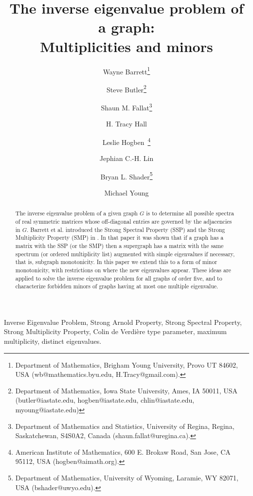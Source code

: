 \documentclass[11pt]{article}
\theoremstyle{definition}
\theoremstyle{definition}
\theoremstyle{definition}
\begin{document}
\title{The inverse eigenvalue problem of a graph: \\
Multiplicities and minors}
\author{Wayne Barrett\thanks{Department of Mathematics, Brigham Young University, Provo UT 84602, USA (wb@mathematics.byu.edu, H.Tracy@gmail.com).}
\and Steve Butler\thanks{Department of Mathematics, Iowa State University, Ames, IA 50011, USA (butler@iastate.edu, hogben@iastate.edu, chlin@iastate.edu, myoung@iastate.edu)}
\and Shaun M. Fallat\thanks{Department of Mathematics and Statistics, University of Regina, Regina, Saskatchewan, S4S0A2, Canada (shaun.fallat@uregina.ca).}
 \and H. Tracy Hall\footnotemark[1]
\and  Leslie Hogben\footnotemark[2]\, \thanks{American Institute of Mathematics, 600 E. Brokaw Road, San Jose, CA 95112, USA (hogben@aimath.org).}
\and Jephian C.-H. Lin\footnotemark[2]
\and Bryan L.  Shader\thanks{Department of Mathematics, University of Wyoming,  Laramie, WY 82071, USA (bshader@uwyo.edu).}
\and Michael Young\footnotemark[2]  
}


 

\maketitle

\begin{abstract} The inverse eigenvalue problem of  a given graph $G$ is to determine all possible spectra of  real symmetric matrices whose off-diagonal entries are governed by
the adjacencies in $G$.  Barrett et al. introduced the Strong Spectral Property (SSP) and the Strong Multiplicity  Property (SMP)  in \cite{genSAP}.  In that paper it was shown that if a graph  has a matrix with the SSP (or the SMP) then a supergraph has a matrix with the same spectrum (or ordered multiplicity list) augmented with simple eigenvalues if necessary, that is, subgraph monotonicity. In this paper we extend this to a form of minor monotonicity, with restrictions on where the new eigenvalues appear.  These ideas are applied to solve the inverse eigenvalue problem for all graphs of order five, and to  characterize forbidden minors of graphs having at most one multiple eigenvalue.
\end{abstract}

 Inverse Eigenvalue Problem, Strong Arnold Property, Strong Spectral Property, Strong Multiplicity Property, Colin de Verdi\`ere type parameter, maximum multiplicity, distinct eigenvalues.\medskip
\end{document}
